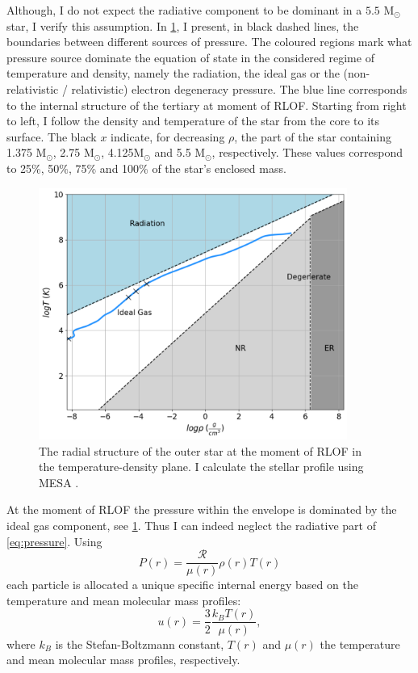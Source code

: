 Although, I do not expect the radiative component to be dominant in a $5.5$ M$_{\odot}$ star, I verify this assumption. In \cref{fig:eos}, I present, in black dashed lines, the boundaries between different sources of pressure. The coloured regions mark what pressure source dominate the equation of state in the considered regime of temperature and density, namely the radiation, the ideal gas or the (non-relativistic / relativistic) electron degeneracy pressure. The blue line corresponds to the internal structure of the tertiary at moment of RLOF. Starting from right to left, I follow the density and temperature of the star from the core to its surface. The black $x$ indicate, for decreasing $\rho$, the part of the star containing 1.375 M$_{\odot}$, 2.75 M$_{\odot}$, 4.125M$_{\odot}$ and 5.5 M$_{\odot}$, respectively. These values correspond to 25\%, 50\%, 75\% and 100\% of the star's enclosed mass.
\begin{figure}[H]
    \centering
    \includegraphics[width=0.9\textwidth]{Thesis/graphs/eos.pdf}
    \caption{ The radial structure of the outer star at the moment of RLOF in the  temperature-density plane. I calculate the stellar profile using MESA \citep{paxton2010modules,paxton2013modules,paxton2015modules,paxton2019modules}.}
    \label{fig:eos}
\end{figure}
At the moment of RLOF the pressure within the envelope is dominated by the ideal gas component, see \cref{fig:eos}. Thus I can indeed neglect the radiative part of \cref{eq:pressure}. Using
\begin{equation}\label{eq:pressure_ideal_gass}
    P(r) =  \frac{\mathcal{R}}{\mu(r)} \rho(r) T(r)
\end{equation}
each particle is allocated a unique specific internal energy based on the temperature and mean molecular mass profiles:
\begin{equation}\label{eq:internal_energy}
    u(r) = \frac{3}{2} \frac{k_B T(r)}{\mu(r)},
\end{equation}
where $k_B$ is the Stefan-Boltzmann constant, $T(r)$ and $\mu(r)$ the temperature and mean molecular mass profiles, respectively.

